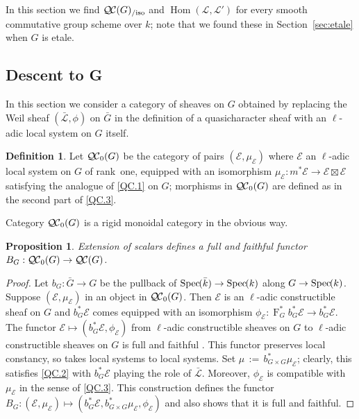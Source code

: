 \documentclass{amsart}
\theoremstyle{plain}
\newtheorem{proposition}[theorem]{Proposition}
\theoremstyle{definition}
\newtheorem{definition}[theorem]{Definition}
\theoremstyle{remark}
\newcommand{\bFq}{\bar{k}}
\newcommand{\Fq}{k}
\newcommand{\Frob}[1]{\operatorname{F}_{#1}}
\DeclareMathOperator{\Hom}{Hom}
\newcommand{\Spec}[1]{{\operatorname{Spec}\hskip-1pt( #1 )}}
\newcommand{\ceq}{{\, :=\, }}
\newcommand{\qcs}[1]{{\mathcal{#1}}}
\newcommand{\gqcs}[1]{{\mathcal{\bar #1}}}
\newcommand{\QC}{{\mathcal{Q\hskip-0.8pt C}}}
\newcommand{\bQC}{{\QC_0}}
\newcommand{\QCiso}[1]{\QC(#1)_{/\text{iso}}}
\newcommand{\bG}{\bar{G}}
\begin{document}
In this section we find $\QCiso{G}$ and $\Hom(\qcs{L},\qcs{L}')$ for every smooth commutative group scheme over $\Fq$; note that we found these in Section~\ref{sec:etale} when $G$ is etale. 

\subsection{Descent to G}\label{sec:bounded}

In this section we consider a category of sheaves on $G$ obtained by
replacing the Weil sheaf $(\gqcs{L}, \phi)$ on $\bG$ in the definition of a quasicharacter sheaf with an $\ell$-adic local system on $G$ itself.

\begin{definition}
Let $\bQC(G)$ be the category of pairs $(\qcs{E},\mu_\qcs{E})$
where $\qcs{E}$ an $\ell$-adic local system on $G$ of rank~one,
equipped with an isomorphism $\mu_\qcs{E} : m^* \qcs{E} \to \qcs{E} \boxtimes \qcs{E}$
satisfying the analogue of \ref{QC.1} on $G$;
morphisms in $\bQC(G)$ are defined as in the second part of
\ref{QC.3}.
\end{definition}

Category $\bQC(G)$ is a rigid monoidal category in the obvious way.

\begin{proposition}\label{prop:BG}
Extension of scalars defines a full and faithful functor $B_G : \bQC(G) \to \QC(G)$.
\end{proposition}

\begin{proof}
 Let $b_G : {\bar G} \to G$ be the pullback of $\Spec{\bFq} \to \Spec{\Fq}$ along $G\to \Spec{\Fq}$.
 Suppose $(\qcs{E},\mu_\qcs{E})$ in an object in $\bQC(G)$.
 Then $\qcs{E}$ is an $\ell$-adic constructible sheaf on $G$ and
 $b_G^* \qcs{E}$ comes equipped with an isomorphism
 $\phi_\qcs{E} : \Frob{G}^* b_G^*\qcs{E} \to b_G^* \qcs{E}$.
 The functor $\qcs{E} \mapsto (b_G^* \qcs{E},\phi_\qcs{E})$
 from $\ell$-adic constructible sheaves on $G$ to $\ell$-adic constructible sheaves on $G$
 is full and faithful .
 This functor preserves local constancy, so takes local systems to local systems.
 Set $\mu \ceq b_{G\times G}^*\mu_\qcs{E}$; clearly, this satisfies \ref{QC.2}
 with $b_G^*\qcs{E}$ playing the role of $\gqcs{L}$.
 Moreover, $\phi_\qcs{E}$ is compatible with $\mu_\qcs{E}$ in the sense of \ref{QC.3}.
 This construction defines the functor $B_G : (\qcs{E},\mu_\qcs{E}) \mapsto (b_G^*\qcs{E},b_{G\times G}^*\mu_\qcs{E}, \phi_\qcs{E})$
 and also shows that it is full and faithful.
\end{proof}
\end{document}
